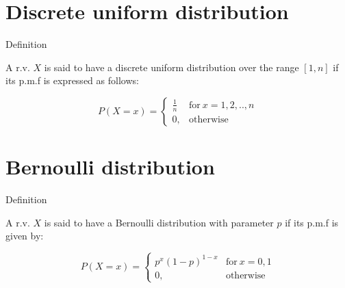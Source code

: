 \documentclass[ignorenonframetext,aspectratio=169]{beamer}
\begin{document}
\hypertarget{discrete-uniform-distribution}{%
\section{Discrete uniform
distribution}\label{discrete-uniform-distribution}}

\begin{frame}{Definition}
\protect\hypertarget{definition}{}

A r.v. \(X\) is said to have a discrete uniform distribution over the
range \([1, n]\) if its p.m.f is expressed as follows:

\[
P(X = x) =
\begin{cases}
\frac{1}{n} & \text{for}~ x = 1,2,..,n \\
0, & \text{otherwise}
\end{cases}
\]

\end{frame}

\hypertarget{bernoulli-distribution}{%
\section{Bernoulli distribution}\label{bernoulli-distribution}}

\begin{frame}{Definition}
\protect\hypertarget{definition-1}{}

A r.v. \(X\) is said to have a Bernoulli distribution with parameter
\(p\) if its p.m.f is given by:

\[
P(X = x) =
\begin{cases}
p^x(1-p)^{1-x} & \text{for}~ x = 0,1 \\
0, & \text{otherwise}
\end{cases}
\]

\end{frame}

\end{document}
